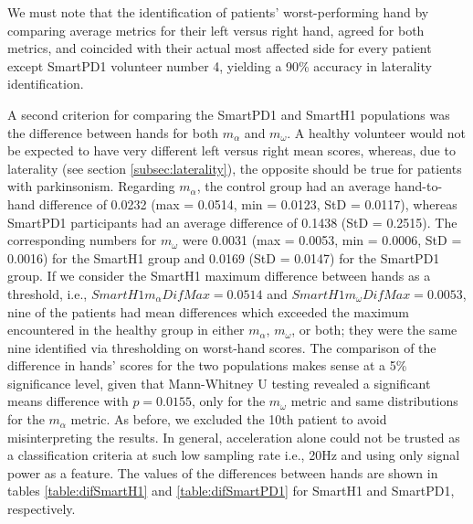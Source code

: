 We must note that the identification of patients' worst-performing hand by comparing average metrics for their left versus right hand, agreed for both metrics, and coincided with their actual most affected side for every patient except \gls{SmartPD1} volunteer number 4, yielding a 90\% accuracy in laterality identification.

A second criterion for comparing the \gls{SmartPD1} and \gls{SmartH1} populations was the difference between hands for both $m_{\alpha}$ and $m_{\omega}$. A healthy volunteer would not be expected to have very different left versus right mean scores, whereas, due to laterality (see section \ref{subsec:laterality}), the opposite should be true for patients with parkinsonism. Regarding $m_{\alpha}$, the control group had an average hand-to-hand difference of 0.0232 (max = 0.0514, min = 0.0123, StD = 0.0117), whereas \gls{SmartPD1} participants had an average difference of 0.1438 (StD = 0.2515). The corresponding numbers for $m_{\omega}$ were 0.0031 (max = 0.0053, min = 0.0006, StD = 0.0016) for the \gls{SmartH1} group and 0.0169 (StD = 0.0147) for the \gls{SmartPD1} group. If we consider the \gls{SmartH1} maximum difference between hands as a threshold, i.e., $SmartH1m_{\alpha}DifMax = 0.0514$ and $SmartH1m_{\omega}DifMax = 0.0053$, nine of the patients had mean differences which exceeded the maximum encountered in the healthy group in either $m_{\alpha}$, $m_{\omega}$, or both; they were the same nine identified via thresholding on worst-hand scores. The comparison of the difference in hands' scores for the two populations makes sense at a 5\% significance level, given that Mann-Whitney U testing revealed a significant means difference with $p = 0.0155$, only for the $m_{\omega}$ metric and same distributions for the $m_{\alpha}$ metric. As before, we excluded the 10th patient to avoid misinterpreting the results. In general, acceleration alone could not be trusted as a classification criteria at such low sampling rate i.e., 20Hz and using only signal power as a feature. The values of the differences between hands are shown in tables \ref{table:difSmartH1} and \ref{table:difSmartPD1} for \gls{SmartH1} and \gls{SmartPD1}, respectively. 

